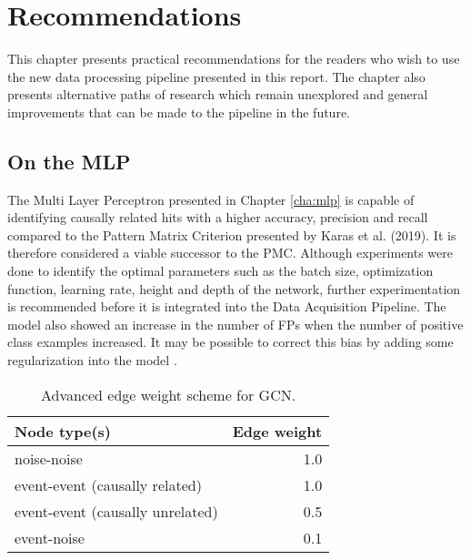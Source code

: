 
\chapter{Recommendations} %
\label{cha:rec}

%

This chapter presents practical recommendations for the readers who
wish to use the new data processing pipeline presented in this report.
The chapter also presents alternative paths of research which remain
unexplored and general improvements that can be made to the pipeline
in the future.

\section{On the MLP}
The Multi Layer Perceptron presented in Chapter \ref{cha:mlp} is
capable of identifying causally related hits with a higher accuracy,
precision and recall compared to the Pattern Matrix Criterion
presented by Karas et al. (2019). It is therefore considered a viable
successor to the PMC. Although experiments were done to identify the
optimal parameters such as the batch size, optimization function,
learning rate, height and depth of the network, further
experimentation is recommended before it is integrated into the Data
Acquisition Pipeline. The model also showed an increase in the number
of FPs when the number of positive class examples increased. It may be
possible to correct this bias by adding some regularization into the
model \cite{Goodfellow-et-al-2016}.

\begin{table}[htb]
  \centering
  \caption{Advanced edge weight scheme for GCN.}
  \begin{tabular}{lr}
    \hline
    Node type(s) & Edge weight \\
    \hline
    noise-noise & 1.0 \\
    event-event (causally related) & 1.0 \\
    event-event (causally unrelated) & 0.5 \\
    event-noise & 0.1 \\
    \hline
  \end{tabular}
  \label{tab:gcn-adv-weights}
\end{table}

